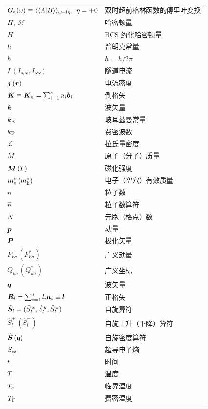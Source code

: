{\small
\begin{tabular}{@{}p{}@{}p{}@{}}
$G_{\rm a}(\omega)\equiv\langle\langle A|B\rangle\rangle_{\omega-{\rm i}\eta},\ \eta=+0$ & 双时超前格林函数的傅里叶变换 \\
$H,\ \mathscr{H}$ & 哈密顿量 \\
$\overline{H}$ & BCS 约化哈密顿量 \\
$h$ & 普朗克常量 \\
$\hbar$ & $\hbar=h/2\pi$ \\
$I\,(I_{NN},I_{SS})$ & 隧道电流 \\
$\bm{j}\,(\bm{r})$ & 电流密度 \\
$\bm{K}\equiv\bm{K}_n=\sum_{i=1}^{s}n_i\bm{b}_i$ & 倒格矢 \\
$\bm{k}$ & 波矢量 \\
$k_{\rm B}$ & 玻耳兹曼常量 \\
$k_{\rm F}$ & 费密波数 \\
$\mathscr{L}$ & 拉氏量密度 \\
$M$ & 原子（分子）质量 \\
$\bm{M}\,(T)$ & 磁化强度 \\
$m_{\rm e}^{*}\,(m_{\rm h}^{*})$ & 电子（空穴）有效质量 \\
$n$ & 粒子数 \\
$\hat{n}$ & 粒子数算符 \\
$N$ & 元胞（格点）数 \\
$\bm{p}$ & 动量 \\
$\bm{P}$ & 极化矢量 \\
$P_{k\sigma}\,(P_{k\sigma}^{*})$ & 广义动量 \\
$Q_{k\sigma}\,(Q_{k\sigma}^{*})$ & 广义坐标 \\
$\bm{q}$ & 波矢量 \\
$\bm{R}_l=\sum_{i=1}^{s}l_i\bm{a}_i\equiv\bm{l}$ & 正格矢 \\
$\hat{\bm{S}}_l=(\hat{S}_l^{\,x},\hat{S}_l^{\,y},\hat{S}_l^{\,z})$ & 自旋算符 \\
$\hat{S}_l^{+}\,(\hat{S}_l^{-})$ & 自旋上升（下降）算符 \\
$\hat{\bm{S}}\,(\bm{q})$ & 自旋密度算符 \\
$S_{\rm es}$ & 超导电子熵 \\
$t$ & 时间 \\
$T$ & 温度 \\
$T_{\rm c}$ & 临界温度 \\
$T_{\rm F}$ & 费密温度 \\
\end{tabular}
}
